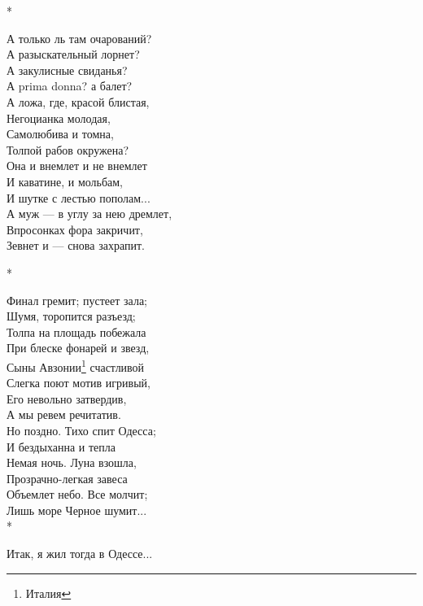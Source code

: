 *

А только ль там очарований?\\
А разыскательный лорнет?\\
А закулисные свиданья?\\
А prima donna? а балет?\\
А ложа, где, красой блистая,\\
Негоцианка молодая,\\
Самолюбива и томна,\\
Толпой рабов окружена?\\
Она и внемлет и не внемлет\\
И каватине, и мольбам,\\
И шутке с лестью пополам...\\
А муж — в углу за нею дремлет,\\
Впросонках фора закричит,\\
Зевнет и — снова захрапит.

*

Финал гремит; пустеет зала;\\
Шумя, торопится разъезд;\\
Толпа на площадь побежала\\
При блеске фонарей и звезд,\\
Сыны Авзонии\footnote{Италия} счастливой\\
Слегка поют мотив игривый,\\
Его невольно затвердив,\\
А мы ревем речитатив.\\
Но поздно. Тихо спит Одесса;\\
И бездыханна и тепла\\
Немая ночь. Луна взошла,\\
Прозрачно-легкая завеса\\
Объемлет небо. Все молчит;\\
Лишь море Черное шумит...\\

*

Итак, я жил тогда в Одессе...\\